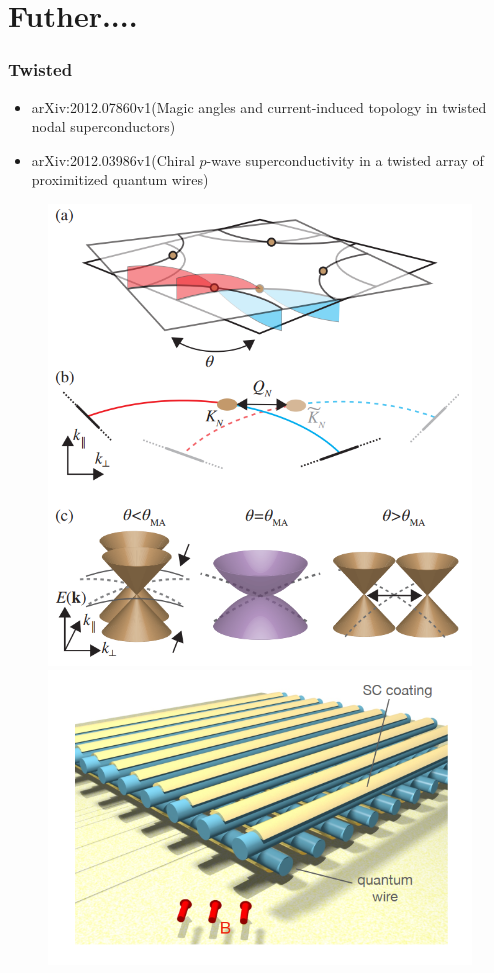 \documentclass{beamer}
\begin{document}
\section{Futher....}
\begin{frame}
\frametitle{Twisted}
\begin{itemize}
	\item arXiv:2012.07860v1(Magic angles and current-induced topology in twisted nodal superconductors)\\
	\item arXiv:2012.03986v1(Chiral $p$-wave superconductivity in a twisted array of proximitized quantum wires)
\end{itemize}
\begin{figure}
\centering
\includegraphics[scale=0.3]{pic/p20.png}
\includegraphics[scale=0.5]{pic/p21.png}
\end{figure}
\end{frame}
\end{document}
